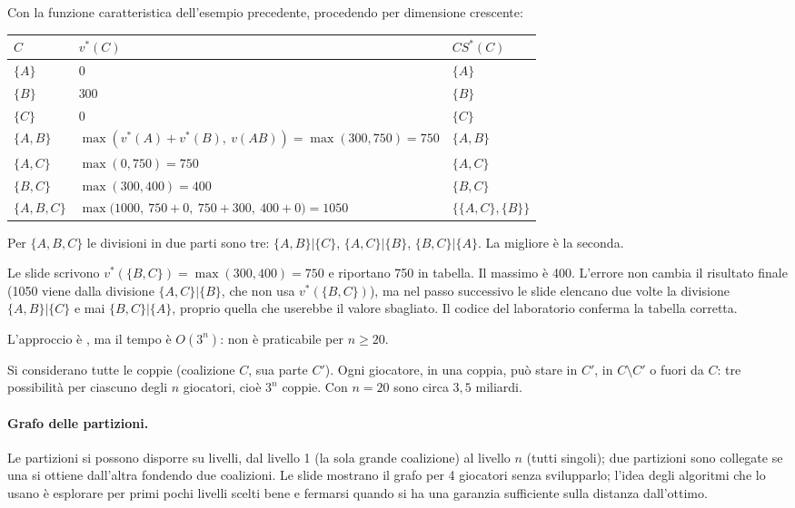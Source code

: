 \begin{esempio}
Con la funzione caratteristica dell'esempio precedente, procedendo per dimensione crescente:
\begin{center}
\renewcommand{\arraystretch}{1.25}
\begin{tabular}{lll}
\toprule
$C$ & $v^*(C)$ & $CS^*(C)$ \\
\midrule
$\{A\}$ & $0$ & $\{A\}$ \\
$\{B\}$ & $300$ & $\{B\}$ \\
$\{C\}$ & $0$ & $\{C\}$ \\
$\{A,B\}$ & $\max(v^*(A)+v^*(B),\ v(AB)) = \max(300, 750) = 750$ & $\{A,B\}$ \\
$\{A,C\}$ & $\max(0, 750) = 750$ & $\{A,C\}$ \\
$\{B,C\}$ & $\max(300, 400) = 400$ & $\{B,C\}$ \\
$\{A,B,C\}$ & $\max\bigl(1000,\ 750 + 0,\ 750 + 300,\ 400 + 0\bigr) = 1050$ & $\{\{A,C\},\{B\}\}$ \\
\bottomrule
\end{tabular}
\end{center}
Per $\{A,B,C\}$ le divisioni in due parti sono tre: $\{A,B\}|\{C\}$, $\{A,C\}|\{B\}$,
$\{B,C\}|\{A\}$. La migliore è la seconda.
\end{esempio}

\begin{attenzione}
Le slide scrivono $v^*(\{B,C\}) = \max(300, 400) = 750$ e riportano 750 in tabella. Il
massimo è 400. L'errore non cambia il risultato finale (1050 viene dalla divisione
$\{A,C\}|\{B\}$, che non usa $v^*(\{B,C\})$), ma nel passo successivo le slide elencano due
volte la divisione $\{A,B\}|\{C\}$ e mai $\{B,C\}|\{A\}$, proprio quella che userebbe il
valore sbagliato. Il codice del laboratorio conferma la tabella corretta.
\end{attenzione}

L'approccio è , ma il tempo è $O(3^n)$: non è praticabile per $n \ge 20$.

\begin{extra}
Si considerano tutte le coppie (coalizione $C$, sua parte $C'$). Ogni giocatore, in una
coppia, può stare in $C'$, in $C \setminus C'$ o fuori da $C$: tre possibilità per ciascuno
degli $n$ giocatori, cioè $3^n$ coppie. Con $n = 20$ sono circa $3{,}5$ miliardi.
\end{extra}

\paragraph{Grafo delle partizioni.}
Le partizioni si possono disporre su livelli, dal livello 1 (la sola grande coalizione) al
livello $n$ (tutti singoli); due partizioni sono collegate se una si ottiene dall'altra
fondendo due coalizioni. Le slide mostrano il grafo per 4 giocatori senza svilupparlo; l'idea
degli algoritmi che lo usano è esplorare per primi pochi livelli scelti bene e fermarsi
quando si ha una garanzia sufficiente sulla distanza dall'ottimo.

